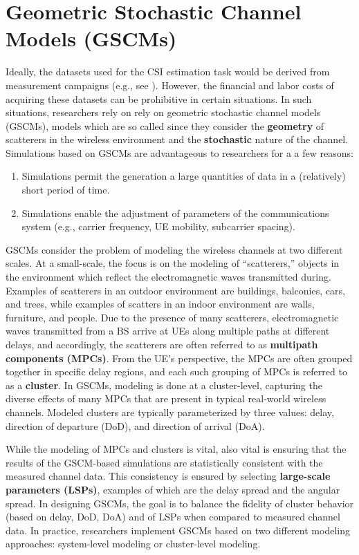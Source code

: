 \section{Geometric Stochastic Channel Models (GSCMs)}
\label{sect:channel_model}

Ideally, the datasets used for the CSI estimation task would be derived from measurement campaigns (e.g., see \cite{ref:shepard2016argoschannel,ref:du2021interuserangle,ref:li20222finegrained}). However, the financial and labor costs of acquiring these datasets can be prohibitive in certain situations. In such situations, researchers rely on  rely on geometric stochastic channel models (GSCMs), models which are so called since they consider the \textbf{geometry} of scatterers in the wireless environment and the \textbf{stochastic} nature of the channel. Simulations based on GSCMs are advantageous to researchers for a a few reasons:
\begin{enumerate}
	\item Simulations permit the generation a large quantities of data in a (relatively) short period of time.
	\item Simulations enable the adjustment of parameters of the communications system (e.g., carrier frequency, UE mobility, subcarrier spacing).
\end{enumerate}

GSCMs consider the problem of modeling the wireless channels at two different scales. At a small-scale, the focus is on the modeling of ``scatterers,'' objects in the environment which reflect the electromagnetic waves transmitted during. Examples of scatterers in an outdoor environment are buildings, balconies, cars, and trees, while examples of scatters in an indoor environment are walls, furniture, and people. Due to the presence of many scatterers, electromagnetic waves transmitted from a BS arrive at UEs along multiple paths at different delays, and accordingly, the scatterers are often referred to as \textbf{multipath components (MPCs)}. From the UE's perspective, the MPCs are often grouped together in specific delay regions, and each such grouping of MPCs is referred to as a \textbf{cluster}. In GSCMs, modeling is done at a cluster-level, capturing the diverse effects of many MPCs that are present in typical real-world wireless channels. Modeled clusters are typically parameterized by three values: delay, direction of departure (DoD), and direction of arrival (DoA).  

While the modeling of MPCs and clusters is vital, also vital is ensuring that the results of the GSCM-based simulations are statistically consistent with the measured channel data. This consistency is ensured by selecting \textbf{large-scale parameters (LSPs)}, examples of which are the delay spread and the angular spread. In designing GSCMs, the goal is to balance the fidelity of cluster behavior (based on delay, DoD, DoA) and of LSPs when compared to measured channel data. In practice, researchers implement GSCMs based on two different modeling approaches: system-level modeling or cluster-level modeling.

